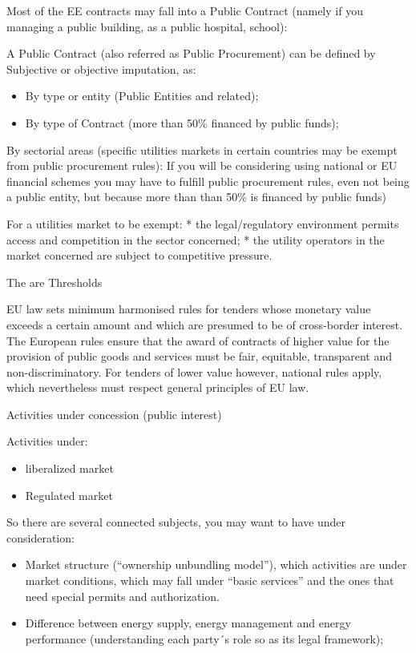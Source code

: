 \documentclass[]{book}
\providecommand{\tightlist}{%
  \setlength{\itemsep}{0pt}\setlength{\parskip}{0pt}}
\theoremstyle{definition}
\theoremstyle{definition}
\theoremstyle{definition}
\theoremstyle{remark}
\begin{document}
Most of the EE contracts may fall into a Public Contract (namely if you
managing a public building, as a public hospital, school):

A Public Contract (also referred as Public Procurement) can be defined
by Subjective or objective imputation, as:

\begin{itemize}
\tightlist
\item
  By type or entity (Public Entities and related);
\item
  By type of Contract (more than 50\% financed by public funds);
\end{itemize}

By sectorial areas (specific utilities markets in certain countries may
be exempt from public procurement rules): If you will be considering
using national or EU financial schemes you may have to fulfill public
procurement rules, even not being a public entity, but because more than
than 50\% is financed by public funds)

For a utilities market to be exempt: * the legal/regulatory environment
permits access and competition in the sector concerned; * the utility
operators in the market concerned are subject to competitive pressure.

The are Thresholds

EU law sets minimum harmonised rules for tenders whose monetary value
exceeds a certain amount and which are presumed to be of cross-border
interest. The European rules ensure that the award of contracts of
higher value for the provision of public goods and services must be
fair, equitable, transparent and non-discriminatory. For tenders of
lower value however, national rules apply, which nevertheless must
respect general principles of EU law.

Activities under concession (public interest)

Activities under:

\begin{itemize}
\item
  liberalized market
\item
  Regulated market
\end{itemize}

So there are several connected subjects, you may want to have under
consideration:

\begin{itemize}
\item
  Market structure (``ownership unbundling model''), which activities
  are under market conditions, which may fall under ``basic services''
  and the ones that need special permits and authorization.
\item
  Difference between energy supply, energy management and energy
  performance (understanding each party´s role so as its legal
  framework);
\end{itemize}
\end{document}
